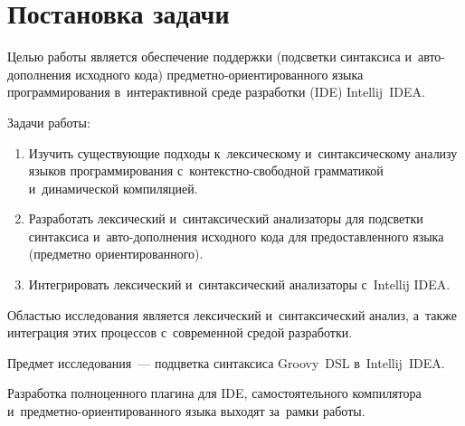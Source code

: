 \section{Постановка задачи} \label{sub21}

Целью работы является обеспечение поддержки (подсветки синтаксиса и~авто-дополнения исходного кода) предметно-ориентированного языка программирования в~интерактивной среде разработки (IDE) Intellij~IDEA.

Задачи работы: 

\begin{enumerate} 
\item{Изучить существующие подходы к~лексическому и~синтаксическому анализу языков программирования с~контекстно-свободной грамматикой и~динамической компиляцией.}	
\item{Разработать лексический и~синтаксический анализаторы для подсветки синтаксиса и~авто-дополнения исходного кода для предоставленного языка (предметно ориентированного).}
\item{Интегрировать лексический и~синтаксический анализаторы с~Intellij IDEA.}
\end{enumerate} 

Областью исследования является лексический и~синтаксический анализ, а~также интеграция этих процессов с~современной средой разработки.

Предмет исследования~--- подцветка синтаксиса Groovy~DSL в~Intellij~IDEA.

Разработка полноценного плагина для IDE, самостоятельного компилятора и~предметно-ориентированного языка выходят за~рамки работы.
